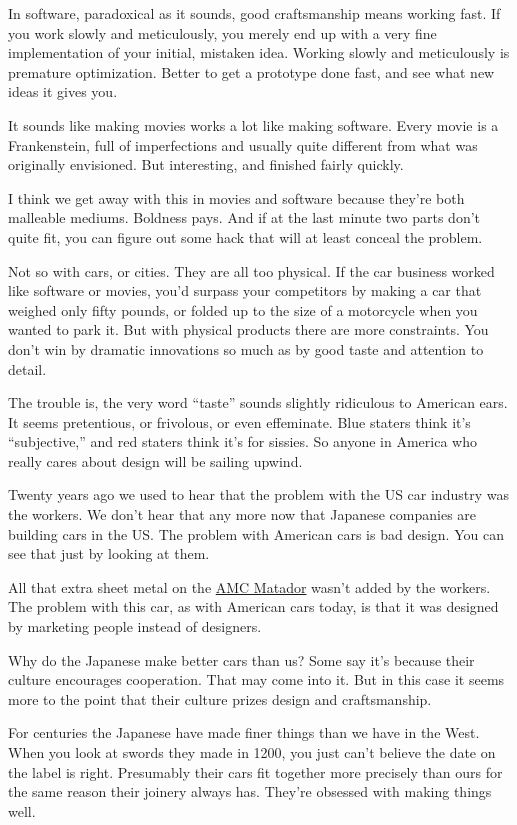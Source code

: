 \documentclass[12pt]{book}
\begin{document}
In software, paradoxical as it sounds, good craftsmanship means working
fast. If you work slowly and meticulously, you merely end up with a very
fine implementation of your initial, mistaken idea. Working slowly and
meticulously is premature optimization. Better to get a prototype done
fast, and see what new ideas it gives you.

It sounds like making movies works a lot like making software. Every
movie is a Frankenstein, full of imperfections and usually quite
different from what was originally envisioned. But interesting, and
finished fairly quickly.

I think we get away with this in movies and software because they're
both malleable mediums. Boldness pays. And if at the last minute two
parts don't quite fit, you can figure out some hack that will at least
conceal the problem.

Not so with cars, or cities. They are all too physical. If the car
business worked like software or movies, you'd surpass your competitors
by making a car that weighed only fifty pounds, or folded up to the size
of a motorcycle when you wanted to park it. But with physical products
there are more constraints. You don't win by dramatic innovations so
much as by good taste and attention to detail.

The trouble is, the very word ``taste'' sounds slightly ridiculous to
American ears. It seems pretentious, or frivolous, or even effeminate.
Blue staters think it's ``subjective,'' and red staters think it's for
sissies. So anyone in America who really cares about design will be
sailing upwind.

Twenty years ago we used to hear that the problem with the US car
industry was the workers. We don't hear that any more now that Japanese
companies are building cars in the US. The problem with American cars is
bad design. You can see that just by looking at them.

All that extra sheet metal on the \href{matador.html}{AMC Matador}
wasn't added by the workers. The problem with this car, as with American
cars today, is that it was designed by marketing people instead of
designers.

Why do the Japanese make better cars than us? Some say it's because
their culture encourages cooperation. That may come into it. But in this
case it seems more to the point that their culture prizes design and
craftsmanship.

For centuries the Japanese have made finer things than we have in the
West. When you look at swords they made in 1200, you just can't believe
the date on the label is right. Presumably their cars fit together more
precisely than ours for the same reason their joinery always has.
They're obsessed with making things well.
\end{document}
